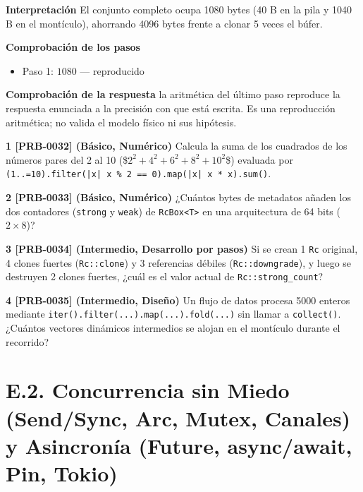 \documentclass{book}
\begin{document}
\begin{tcolorbox}[title={Problema resuelto}, studiumworked, breakable]
\noindent\textbf{Interpretación}
El conjunto completo ocupa 1080 bytes (40 B en la pila y 1040 B en el montículo), ahorrando 4096 bytes frente a clonar 5 veces el búfer.

\noindent\textbf{Comprobación de los pasos}
\begin{itemize}
\item Paso 1: $1080$ — reproducido
\end{itemize}

\noindent\textbf{Comprobación de la respuesta} la aritmética del último paso reproduce la respuesta enunciada a la precisión con que está escrita. Es una reproducción aritmética; no valida el modelo físico ni sus hipótesis.
\end{tcolorbox}

\begin{tcolorbox}[title={Ejercicios}, studiumworked, breakable]

\noindent\textbf{1 [PRB-0032] (Básico, Numérico)}
Calcula la suma de los cuadrados de los números pares del 2 al 10 (\$\(2^2 + 4^2 + 6^2 + 8^2 + 10^2\)\$) evaluada por \texttt{(1..=10).filter(|x| x \% 2 == 0).map(|x| x * x).sum()}.

\noindent\textbf{2 [PRB-0033] (Básico, Numérico)}
¿Cuántos bytes de metadatos añaden los dos contadores (\texttt{strong} y \texttt{weak}) de \texttt{RcBox<T>} en una arquitectura de 64 bits (\(2 \times 8\))?

\noindent\textbf{3 [PRB-0034] (Intermedio, Desarrollo por pasos)}
Si se crean 1 \texttt{Rc} original, 4 clones fuertes (\texttt{Rc::clone}) y 3 referencias débiles (\texttt{Rc::downgrade}), y luego se destruyen 2 clones fuertes, ¿cuál es el valor actual de \texttt{Rc::strong\_count}?

\noindent\textbf{4 [PRB-0035] (Intermedio, Diseño)}
Un flujo de datos procesa 5000 enteros mediante \texttt{iter().filter(...).map(...).fold(...)} sin llamar a \texttt{collect()}. ¿Cuántos vectores dinámicos intermedios se alojan en el montículo durante el recorrido?
\end{tcolorbox}

\chapter{E.2. Concurrencia sin Miedo (Send/Sync, Arc, Mutex, Canales) y Asincronía (Future, async/await, Pin, Tokio)}
\label{chap:cap06-concurrencia-sin-miedo-send-sync-async-tokio-pin}
\end{document}
